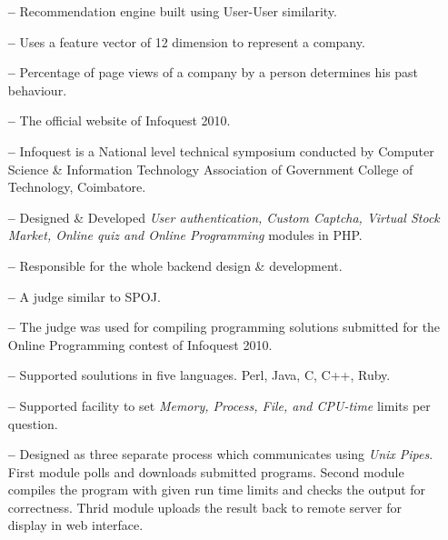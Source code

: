 \documentclass{cv}
\begin{document}
\begin{description}[leftmargin=50pt,labelwidth=50pt]
\begin{itemize}[label={},leftmargin=10pt,topsep=0pt]
      \item[\textbf{--}] Recommendation engine built using User-User similarity.
      \item[\textbf{--}] Uses a feature vector of 12 dimension to represent a company.
      \item[\textbf{--}] Percentage of page views of a company by a person determines his past behaviour.
    \end{itemize}
  \item[infoquestgct.com] \hfill
    \begin{itemize}[label={},leftmargin=10pt,topsep=0pt]
      \item[\textbf{--}] The official website of Infoquest 2010.  
      \item[\textbf{--}] Infoquest is a National level technical symposium conducted by Computer Science \& Information Technology Association of Government College of Technology, Coimbatore.
      \item[\textbf{--}] Designed \& Developed \textit{User authentication, Custom Captcha, Virtual Stock Market, Online quiz and Online Programming} modules in PHP\@.
      \item[\textbf{--}] Responsible for the whole backend design \& development.
    \end{itemize}
  \item[Online Judge] \hfill
    \begin{itemize}[label={},leftmargin=10pt,topsep=0pt]
      \item[\textbf{--}] A judge similar to SPOJ\@.
      \item[\textbf{--}] The judge was used for compiling programming solutions submitted for the Online Programming contest of Infoquest 2010.
      \item[\textbf{--}] Supported soulutions in five languages. Perl, Java, C, C++, Ruby.
      \item[\textbf{--}] Supported facility to set \textit{Memory, Process, File, and CPU-time} limits per question.
      \item[\textbf{--}] Designed as three separate process which communicates using \textit{Unix Pipes}.  First module polls and downloads submitted programs.  Second module compiles the program with given run time limits and checks the output for correctness.  Thrid module uploads the result back to remote server for display in web interface.
    \end{itemize}
  \item[Desktop Search] \hfill
    \begin{itemize}[label={},leftmargin=10pt,topsep=0pt]

\end{itemize}
\end{description}
\end{document}
